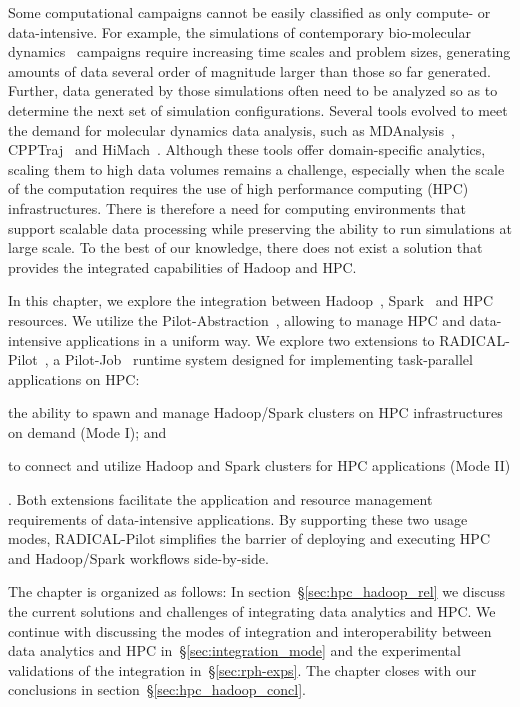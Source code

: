 Some computational campaigns cannot be easily classified as only compute- or
data-intensive. For example, the simulations of contemporary bio-molecular
dynamics~\cite{dror2012biomolecular} campaigns require increasing time scales
and problem sizes,  generating amounts of data several order of magnitude larger
than those so far generated. Further, data generated by those simulations often
need to be analyzed so as to determine the next set of simulation
configurations. Several tools evolved to meet the demand for molecular dynamics
data analysis, such as
MDAnalysis~\cite{michaud2011mdanalysis,gowers2016mdanalysis},
CPPTraj~\cite{roe2013ptraj} and HiMach~\cite{tiankai2008scalable}. Although
these tools offer domain-specific analytics, scaling them to high data volumes
remains a challenge, especially when the scale of the computation requires the
use of high performance computing (HPC) infrastructures. There is therefore a
need for computing environments that support scalable data processing while
preserving the ability to run simulations at large scale. To the best of our
knowledge, there does not exist a solution that provides the integrated
capabilities of Hadoop and HPC.

In this chapter, we explore the integration between Hadoop~\cite{hadoop},
Spark~\cite{zaharia2010spark} and HPC resources. We utilize the
Pilot-Abstraction~\cite{luckow2012pstar}, allowing to manage HPC and
data-intensive applications in a uniform way. We explore two extensions to
RADICAL-Pilot~\cite{merzky2018design}, a Pilot-Job~\cite{luckow2012pstar}
runtime system designed for implementing task-parallel applications on HPC:
\begin{inparaenum}[1)]
    \item the ability to spawn and manage Hadoop/Spark clusters on HPC infrastructures on demand (Mode I); and
    \item to connect and utilize Hadoop and Spark clusters for HPC applications
    (Mode II)
\end{inparaenum}.
Both extensions facilitate the application and
resource management requirements of data-intensive applications. By supporting
these two usage modes, RADICAL-Pilot simplifies the barrier of deploying and
executing HPC and Hadoop/Spark workflows side-by-side.

The chapter is organized as follows: In section~\S\ref{sec:hpc_hadoop_rel} we
discuss the current solutions and challenges of integrating data analytics and
HPC. We continue with discussing the modes of integration and interoperability
between data analytics and HPC in~\S\ref{sec:integration_mode} and the
experimental validations of the integration in~\S\ref{sec:rph-exps}. The chapter
closes with our conclusions in section~\S\ref{sec:hpc_hadoop_concl}.


